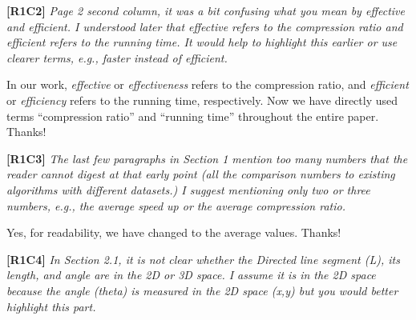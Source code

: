 \documentclass{letter}
\newcommand{\ie}{\emph{i.e.,}\xspace}
\begin{document}




\textbf{[R1C2]} \emph{Page 2 second column, it was a bit confusing what you mean by effective and efficient. I understood later that effective refers to the compression ratio and efficient refers to the running time. It would help to highlight this earlier or use clearer terms, e.g., faster instead of efficient.}

In our work, \emph{effective} or \emph{effectiveness} refers to the compression ratio, and \emph{efficient} or \emph{efficiency} refers to the running time, respectively. Now we have directly used terms ``compression ratio'' and ``running time'' throughout the entire paper. Thanks!


\textbf{[R1C3]} \emph{The last few paragraphs in Section 1 mention too many numbers that the reader cannot digest at that early point (all the comparison numbers to existing algorithms with different datasets.) I suggest mentioning only two or three numbers, e.g., the average speed up or the average compression ratio.}

Yes, for readability, we have changed to the average values. Thanks!

\textbf{[R1C4]} \emph{In Section 2.1, it is not clear whether the Directed line segment (L), its length, and angle are in the 2D or 3D space. I assume it is in the 2D space because the angle (theta) is measured in the 2D space (x,y) but you would better highlight this part.}
\end{document}
